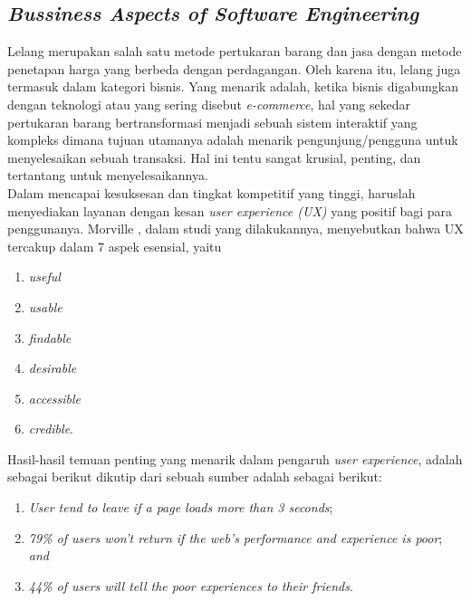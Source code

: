\subsection{\textit{Bussiness Aspects of Software Engineering}}
	
	Lelang merupakan salah satu metode pertukaran barang dan jasa dengan metode penetapan harga yang berbeda dengan perdagangan. Oleh karena itu, lelang juga termasuk dalam kategori bisnis. Yang menarik adalah, ketika bisnis digabungkan dengan teknologi atau yang sering disebut \textit{e-commerce}, hal yang sekedar pertukaran barang bertransformasi menjadi sebuah sistem interaktif yang kompleks dimana tujuan utamanya adalah menarik pengunjung/pengguna untuk menyelesaikan sebuah transaksi. Hal ini tentu sangat krusial, penting, dan tertantang untuk menyelesaikannya. \\
	\indent Dalam mencapai kesuksesan dan tingkat kompetitif yang tinggi, haruslah menyediakan layanan dengan kesan \textit{user experience (UX)} yang positif bagi para penggunanya. Morville  \cite[p.~27]{a-set-of-heuristics-2014} , dalam studi yang dilakukannya, menyebutkan bahwa UX tercakup dalam 7 aspek esensial, yaitu \begin{enumerate}[label=\alph*.]
		\item \textit{useful}
		\item \textit{usable}
		\item \textit{findable}
		\item \textit{desirable}
		\item \textit{accessible}
		\item \textit{credible}.
		\end{enumerate}
	
	\indent Hasil-hasil temuan penting yang menarik dalam pengaruh \textit{user experience}, adalah sebagai berikut dikutip dari sebuah sumber adalah sebagai berikut:
	\begin{enumerate}[label=\alph*.]
		\item \textit{User tend to leave if a page loads more than 3 seconds};
		\item \textit{79\% of users won't return if the web's performance and experience is poor}; \textit{and}
		\item \textit{44\% of users will tell the poor experiences to their friends}.
	\end{enumerate}
	
